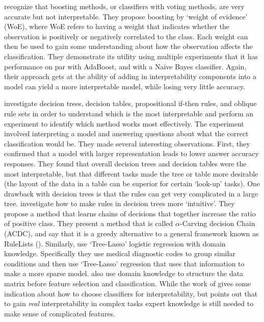     \citet{Ridgeway1998-lv} recognize that boosting methods, or classifiers with voting methods, are very accurate but not interpretable. They propose boosting by `weight of evidence' (WoE), where WoE refers to having a weight that indicates whether the observation is positively or negatively correlated to the class. Each weight can then be used to gain some understanding about how the observation affects the classification. They demonstrate its utility using multiple experiments that it has performance on par with AdaBoost, and with a Naive Bayes classifier.  Again, their approach gets at the ability of adding in interpretability components into a model can yield a more interpretable model, while losing very little accuracy.

    \citet{Huysmans2011-th} investigate decision trees, decision tables, propositional if-then rules, and oblique rule sets in order to understand which is the most interpretable and perform an experiment to identify which method works most effectively. The experiment involved interpreting a model and answering questions about what the correct classification would be. They made several interesting observations. First, they confirmed that a model with larger representation leads to lower answer accuracy responses. They found that overall decision trees and decision tables were the most interpretable, but that different tasks made the tree or table more desirable (the layout of the data in a table can be superior for certain `look-up' tasks). 
    One drawback with decision trees is that the rules can get very complicated in a large tree. \citet{Park2016-ld} investigate how to make rules in decision trees more `intuitive'. They propose a method that learns chains of decisions that together increase the ratio of positive class. They present a method that is called $\alpha$-Carving decision Chain (ACDC), and say that it is a greedy alternative to a general framework known as RuleLists (\citet{Wang2015-ww}). 
    Similarly, \citet{Jovanovic2016-gw} use `Tree-Lasso' logistic regression with domain knowledge. Specifically they use medical diagnostic codes to group similar conditions and then use `Tree-Lasso' regression that uses that information to make a more sparse model. \citet{Zycinski2012-jj} also use domain knowledge to structure the data matrix before feature selection and classification. While the work of \citeauthor{Huysmans2011-th} gives some indication about how to choose classifiers for interpretability, but \citeauthor{Park2016-ld} points out that to gain \emph{real} interpretability in complex tasks expert knowledge is still needed to make sense of complicated features.

